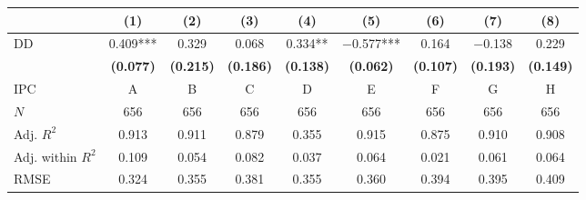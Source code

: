 
\begin{tabular}[t]{lcccccccc}
\toprule
  & (1) & (2) & (3) & (4) & (5) & (6) & (7) & (8)\\
\midrule
DD & \num{0.409}*** & \num{0.329} & \num{0.068} & \num{0.334}** & \num{-0.577}*** & \num{0.164} & \num{-0.138} & \num{0.229}\\
\textbf{} & \textbf{(\num{0.077})} & \textbf{(\num{0.215})} & \textbf{(\num{0.186})} & \textbf{(\num{0.138})} & \textbf{(\num{0.062})} & \textbf{(\num{0.107})} & \textbf{(\num{0.193})} & \textbf{(\num{0.149})}\\
\midrule
IPC & A & B & C & D & E & F & G & H\\
$N$ & \num{656} & \num{656} & \num{656} & \num{656} & \num{656} & \num{656} & \num{656} & \num{656}\\
Adj. $R^2$ & \num{0.913} & \num{0.911} & \num{0.879} & \num{0.355} & \num{0.915} & \num{0.875} & \num{0.910} & \num{0.908}\\
Adj. within $R^2$ & \num{0.109} & \num{0.054} & \num{0.082} & \num{0.037} & \num{0.064} & \num{0.021} & \num{0.061} & \num{0.064}\\
RMSE & \num{0.324} & \num{0.355} & \num{0.381} & \num{0.355} & \num{0.360} & \num{0.394} & \num{0.395} & \num{0.409}\\
\bottomrule
\end{tabular}
